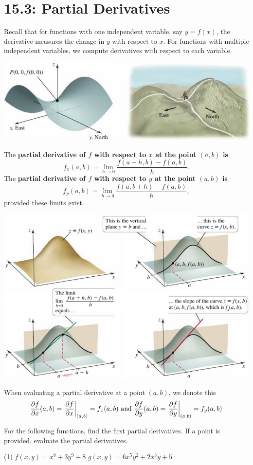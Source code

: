 \documentclass[mathNotesPreamble]{subfiles}
\begin{document}
\section{15.3: Partial Derivatives}

  Recall that for functions with one independent variable, say $y=f(x)$, the derivative measures the change in $y$ with respect to $x$. For functions with multiple independent variables, we compute derivatives with respect to each variable.

  \begin{center}
    \includegraphics[width=0.45\linewidth]{images/briggs_15_03/fig15_30}
  \end{center}

  \begin{defn*}
    The \textbf{partial derivative of $f$ with respect to $x$ at the point $(a,b)$ is}
      \[f_x(a,b)=\lim_{h\to 0} \frac{f(a+h,b)-f(a,b)}{h}.\]
    The \textbf{partial derivative of $f$ with respect to $y$ at the point $(a,b)$ is}
      \[f_y(a,b)=\lim_{h\to 0} \frac{f(a,b+h)-f(a,b)}{h},\]
    provided these limits exist.
  \end{defn*}

  \begin{center}
    \includegraphics[width=0.5\linewidth]{images/briggs_15_03/fig15_31}
  \end{center}
  \pagebreak

  When evaluating a partial derivative at a point $(a,b)$, we denote this
    \[\frac{\partial f}{\partial x}(a,b)=\left.\frac{\partial f}{\partial x}\right|_{(a,b)}=f_x(a,b) \textnormal{ and }\frac{\partial f}{\partial y}(a,b)=\left.\frac{\partial f}{\partial y}\right|_{(a,b)}=f_y(a,b)\]
  \begin{ex*}
    For the following functions, find the first partial derivatives. If a point is provided, evaluate the partial derivatives.
  \end{ex*}
  \begin{tasks}[after-item-skip=\stretch{1}, label=](1)
    \task $f(x,y)=x^8+3y^9+8$
    \task $g(x,y)=6x^5y^2+2x^3y+5$
  \end{tasks}
  \pagebreak
\end{document}
